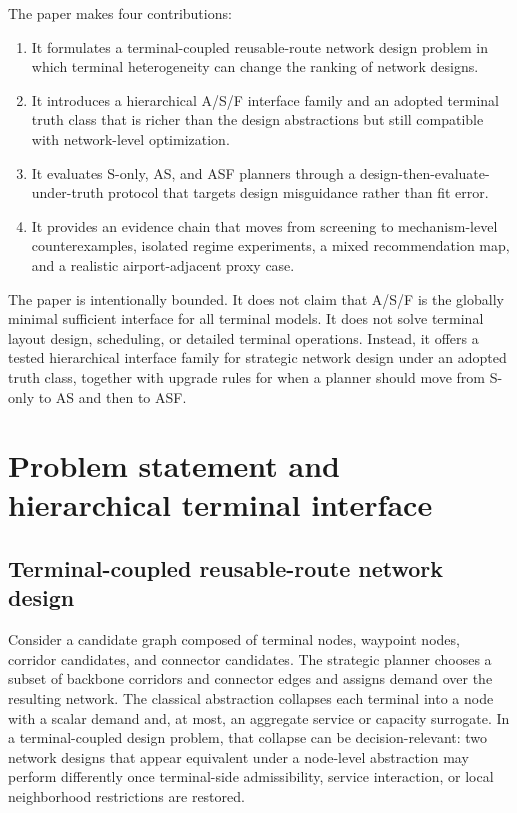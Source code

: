 \documentclass[review,authoryear]{elsarticle}
\begin{document}
The paper makes four contributions:
\begin{enumerate}[label=(\roman*)]
  \item It formulates a terminal-coupled reusable-route network design problem in which terminal heterogeneity can change the ranking of network designs.
  \item It introduces a hierarchical A/S/F interface family and an adopted terminal truth class that is richer than the design abstractions but still compatible with network-level optimization.
  \item It evaluates S-only, AS, and ASF planners through a design-then-evaluate-under-truth protocol that targets design misguidance rather than fit error.
  \item It provides an evidence chain that moves from screening to mechanism-level counterexamples, isolated regime experiments, a mixed recommendation map, and a realistic airport-adjacent proxy case.
\end{enumerate}

The paper is intentionally bounded. It does not claim that A/S/F is the globally minimal sufficient interface for all terminal models. It does not solve terminal layout design, scheduling, or detailed terminal operations. Instead, it offers a tested hierarchical interface family for strategic network design under an adopted truth class, together with upgrade rules for when a planner should move from S-only to AS and then to ASF.


\section{Problem statement and hierarchical terminal interface}
\label{sec:problem}

\subsection{Terminal-coupled reusable-route network design}
\label{sec:problem:coupled}

Consider a candidate graph composed of terminal nodes, waypoint nodes, corridor candidates, and connector candidates. The strategic planner chooses a subset of backbone corridors and connector edges and assigns demand over the resulting network. The classical abstraction collapses each terminal into a node with a scalar demand and, at most, an aggregate service or capacity surrogate. In a terminal-coupled design problem, that collapse can be decision-relevant: two network designs that appear equivalent under a node-level abstraction may perform differently once terminal-side admissibility, service interaction, or local neighborhood restrictions are restored.
\end{document}

